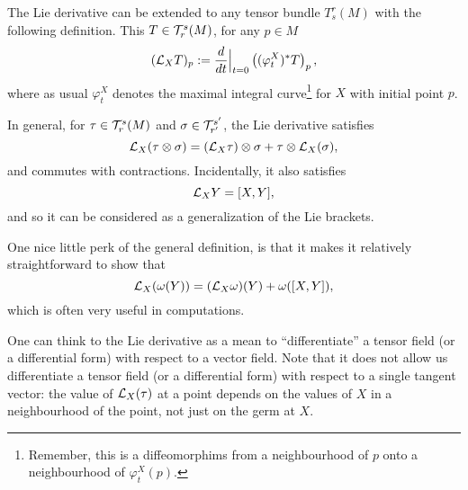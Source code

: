 \begin{remark}
	The Lie derivative can be extended to any tensor bundle $T_s^r(M)$ with the following definition.
	This $T\in\mathcal{T}_r^s(M)$, for any $p\in M$
	\begin{equation}
		(\mathcal{L}_X T)_p := \frac{d}{dt}\Big|_{t=0}\left((\varphi_t^X)^* T\right)_p,
	\end{equation}
	where as usual $\varphi_t^X$ denotes the maximal integral curve\footnote{Remember, this is a diffeomorphims from a neighbourhood of $p$ onto a neighbourhood of $\varphi_t^X(p)$.} for $X$ with initial point $p$.

	In general, for $\tau\in\mathcal{T}_r^s(M)$ and $\sigma\in\mathcal{T}_{r'}^{s'}$, the Lie derivative satisfies
	\begin{equation}
		\mathcal{L}_X(\tau\otimes\sigma) = (\mathcal{L}_X\tau)\otimes\sigma + \tau\otimes\mathcal{L}_X(\sigma),
	\end{equation}
	and commutes with contractions.
	Incidentally, it also satisfies
	\begin{equation}
		\mathcal{L}_XY = [X,Y],
	\end{equation}
	and so it can be considered as a generalization of the Lie brackets.

	One nice little perk of the general definition, is that it makes it relatively straightforward to show that
	\begin{equation}\label{eq:cLXwBrackets}
		\mathcal{L}_X(\omega(Y)) = (\mathcal{L}_X\omega)(Y) + \omega([X,Y]),
	\end{equation}
	which is often very useful in computations.

	One can think to the Lie derivative as a mean to ``differentiate'' a tensor field (or a differential form) with respect to a vector field.
	Note that it does not allow us differentiate a tensor field (or a differential form) with respect to a single tangent vector: the value of $\mathcal{L}_X(\tau)$ at a point depends on the values of $X$ in a neighbourhood of the point, not just on the germ at $X$.
\end{remark}
